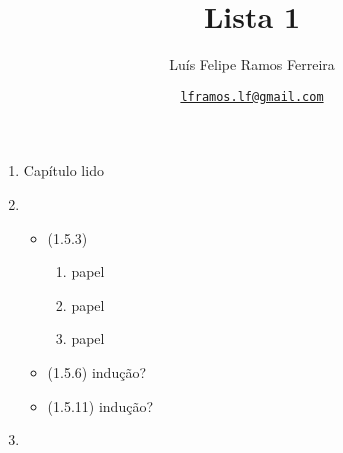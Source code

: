 \documentclass{article}
\title{Lista 1}
\author{Luís Felipe Ramos Ferreira}
\date{\href{mailto:lframos.lf@gmail.com}{\texttt{lframos.lf@gmail.com}}
}
\begin{document}
\maketitle

\begin{enumerate}

	\item Capítulo lido
	\item
	      \begin{itemize}
		      \item (1.5.3)
		            \begin{enumerate}
			            \item papel
			            \item papel
			            \item papel
		            \end{enumerate}
		      \item (1.5.6) indução?
		      \item (1.5.11) indução?
	      \end{itemize}
	\item

\end{enumerate}
\end{document}
